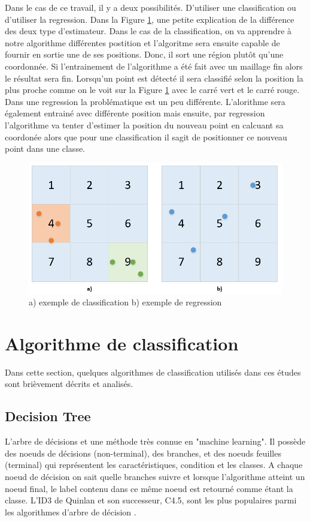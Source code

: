 Dans le cas de ce travail, il y a deux possibilités. D'utiliser une classification ou d'utiliser la regression. Dans la Figure \ref{fig:ClassReg}, une petite explication de la différence des deux type d'estimateur. Dans le cas de la classification, on va apprendre à notre algorithme différentes postition et l'algoritme sera ensuite capable de fournir en sortie une de ses positions. Donc, il sort une région plutôt qu'une coordonnée. Si l'entrainement de l'algorithme a été fait avec un maillage fin alors le résultat sera fin. Lorsqu'un point est détecté il sera classifié selon la position la plus proche comme on le voit sur la Figure \ref{fig:ClassReg} avec le carré vert et le carré rouge. Dans une regression la problématique est un peu différente. L'alorithme sera également entrainé avec différente position mais ensuite, par regression l'algorithme va tenter d'estimer la position du nouveau point en calcuant sa coordonée alors que pour une classification il sagit de positionner ce nouveau point dans une classe. 

\begin{figure}[htp]
	\begin{center}
		\includegraphics[scale=0.5]{figures/ClassReg.png}
		\caption{a) exemple de classification  b) exemple de regression}
		\label{fig:ClassReg} %
	\end{center}
\end{figure}

\section{Algorithme de classification}
Dans cette section, quelques algorithmes de classification utilisés dans ces études \cite{ML_indoor} \cite{CP_RSS} sont brièvement décrits et analisés.

\subsection{Decision Tree}
L'arbre de décisions et une méthode très connue en "machine learning". Il possède des noeuds de décisions (non-terminal), des branches, et des noeuds feuilles (terminal) qui représentent les caractéristiques, condition et les classes. A chaque noeud de décision on sait quelle branches suivre et lorsque l'algorithme atteint un noeud final, le label contenu dans ce même noeud est retourné comme étant la classe. 
L’ID3 de Quinlan et son successeur, C4.5, sont les plus populaires parmi les algorithmes d’arbre de décision \cite{C4_5}.

